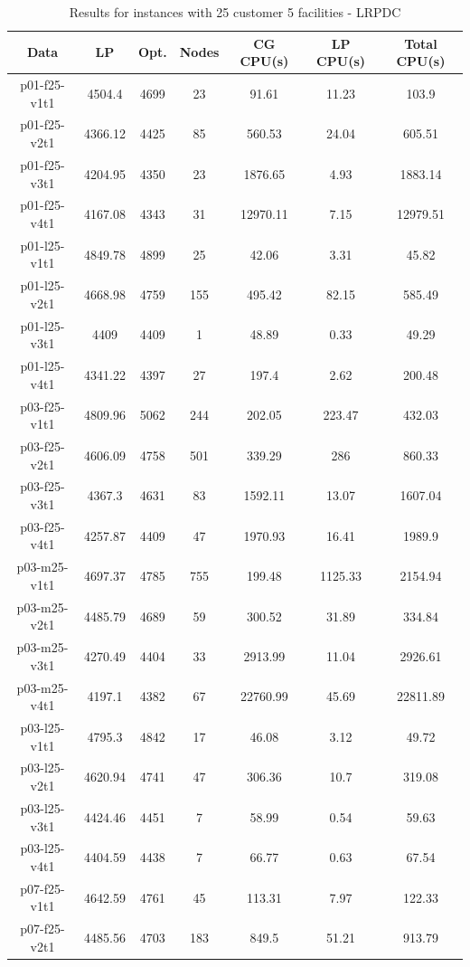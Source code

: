 \begin{table}[h!tbp]
\centering
\caption{Results for instances with 25 customer 5 facilities - LRPDC}\label{25Cust_lrpdc}
\begin {tabular}[t]{|c|c|c|c|c|c|c|}  
\hline
{\bf Data} & {\bf LP} & {\bf Opt.} & {\bf Nodes} & {\bf CG CPU(s) } & {\bf LP CPU(s)} & {\bf Total CPU(s)}\\\hline%
p01-f25-v1t1	&	4504.4	&	4699	&	23	&	91.61	&	11.23	&	103.9	\\
p01-f25-v2t1	&	4366.12	&	4425	&	85	&	560.53	&	24.04	&	605.51	\\
p01-f25-v3t1	&	4204.95	&	4350	&	23	&	1876.65	&	4.93	&	1883.14	\\
p01-f25-v4t1	&	4167.08	&	4343	&	31	&	12970.11	&	7.15	&	12979.51	\\
p01-l25-v1t1	&	4849.78	&	4899	&	25	&	42.06	&	3.31	&	45.82	\\
p01-l25-v2t1	&	4668.98	&	4759	&	155	&	495.42	&	82.15	&	585.49	\\
p01-l25-v3t1	&	4409	&	4409	&	1	&	48.89	&	0.33	&	49.29	\\
p01-l25-v4t1	&	4341.22	&	4397	&	27	&	197.4	&	2.62	&	200.48	\\
p03-f25-v1t1	&	4809.96	&	5062	&	244	&	202.05	&	223.47	&	432.03	\\
p03-f25-v2t1	&	4606.09	&	4758	&	501	&	339.29	&	286	&	860.33	\\
p03-f25-v3t1	&	4367.3	&	4631	&	83	&	1592.11	&	13.07	&	1607.04	\\
p03-f25-v4t1	&	4257.87	&	4409	&	47	&	1970.93	&	16.41	&	1989.9	\\
p03-m25-v1t1	&	4697.37	&	4785	&	755	&	199.48	&	1125.33	&	2154.94	\\
p03-m25-v2t1	&	4485.79	&	4689	&	59	&	300.52	&	31.89	&	334.84	\\
p03-m25-v3t1	&	4270.49	&	4404	&	33	&	2913.99	&	11.04	&	2926.61	\\
p03-m25-v4t1	&	4197.1	&	4382	&	67	&	22760.99	&	45.69	&	22811.89	\\
p03-l25-v1t1	&	4795.3	&	4842	&	17	&	46.08	&	3.12	&	49.72	\\
p03-l25-v2t1	&	4620.94	&	4741	&	47	&	306.36	&	10.7	&	319.08	\\
p03-l25-v3t1	&	4424.46	&	4451	&	7	&	58.99	&	0.54	&	59.63	\\
p03-l25-v4t1	&	4404.59	&	4438	&	7	&	66.77	&	0.63	&	67.54	\\
p07-f25-v1t1	&	4642.59	&	4761	&	45	&	113.31	&	7.97	&	122.33	\\
p07-f25-v2t1	&	4485.56	&	4703	&	183	&	849.5	&	51.21	&	913.79	\\

\end{tabular}
\end{table}
